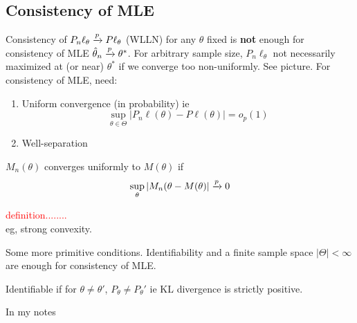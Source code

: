\documentclass{article}
\newcommand\myworries[1]{\textcolor{red}{#1}}
\begin{document}
\subsection{Consistency of MLE}
Consistency of $P_n \ell_\theta \xrightarrow{p} P \ell_\theta $ (WLLN) for any $\theta$ fixed is \textbf{not} enough for consistency of MLE $\hat \theta_n \xrightarrow{p} \theta^*$. For arbitrary sample size, $P_n \ell_\theta$ not necessarily maximized at (or near) $\theta^*$ if we converge too non-uniformly. See picture.  For consistency of MLE, need:
\begin{enumerate}
	\item Uniform convergence (in probability) ie 
	$$\sup_{\theta \in \Theta} |P_n \ell (\theta) - P \ell(\theta)| = o_p(1)$$
	\item Well-separation 
\end{enumerate}
\begin{definition}
$M_n(\theta)$ converges uniformly to $M(\theta)$ if 
$$\sup_{\theta} |M_n(\theta - M(\theta)| \xrightarrow{p} 0$$
\end{definition}
\begin{definition}
\myworries{definition........}\\
eg, strong convexity. 
\end{definition}
Some more primitive conditions. Identifiability and a finite sample space $|\Theta|<\infty$ are enough for consistency of MLE. 
\begin{definition}[Identifiability]
Identifiable if for $\theta \neq \theta'$, $P_\theta \neq P_\theta'$ ie KL divergence is strictly positive. 
\end{definition}
\begin{example}
In my notes
\end{example}
\end{document}

